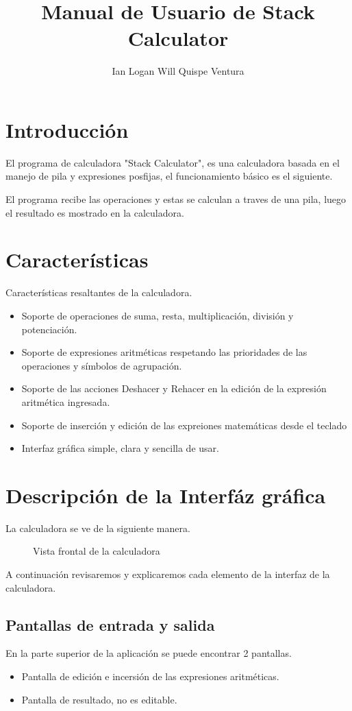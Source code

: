\documentclass[a4paper,12pt]{article}
\title{Manual de Usuario de Stack Calculator}
\author{Ian Logan Will Quispe Ventura}
\date{}
\begin{document}
\maketitle

\section{Introducción}
El programa de calculadora "Stack Calculator", es una calculadora basada en el manejo de pila y expresiones posfijas, el funcionamiento básico es el siguiente.

El programa recibe las operaciones y estas se calculan a traves de una pila, luego el resultado es mostrado en la calculadora. 

\section{Características}
Características resaltantes de la calculadora.
\begin{itemize}
    \item Soporte de operaciones de suma, resta, multiplicación, división y potenciación.
    \item Soporte de expresiones aritméticas respetando las prioridades de las operaciones y símbolos de agrupación.
    \item Soporte de las acciones Deshacer y Rehacer en la edición de la expresión aritmética ingresada.
    \item Soporte de inserción y edición de las expreiones matemáticas desde el teclado 
    \item Interfaz gráfica simple, clara y sencilla de usar.
\end{itemize}

\section{Descripción de la Interfáz gráfica}
La calculadora se ve de la siguiente manera.
\begin{figure}[h!]
    \centering
    \caption{Vista frontal de la calculadora}
    \label{fig:vista-frontal}
\end{figure}

A continuación revisaremos y explicaremos cada elemento de la interfaz de la calculadora. 
\subsection{Pantallas de entrada y salida}
En la parte superior de la aplicación se puede encontrar 2 pantallas.
\begin{itemize}
    \item Pantalla de edición e incersión de las expresiones aritméticas.
    \item Pantalla de resultado, no es editable. 
\end{itemize}
\end{document}
